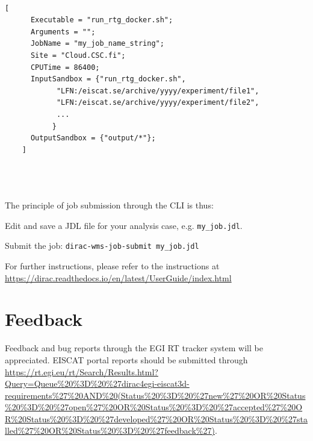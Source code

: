 \documentclass[a4paper]{article}
\begin{document}
\begin{verbatim}
 
[
      Executable = "run_rtg_docker.sh";
      Arguments = "";
      JobName = "my_job_name_string";
      Site = "Cloud.CSC.fi";
      CPUTime = 86400;
      InputSandbox = {"run_rtg_docker.sh",
            "LFN:/eiscat.se/archive/yyyy/experiment/file1",
            "LFN:/eiscat.se/archive/yyyy/experiment/file2",
            ...
           }
      OutputSandbox = {"output/*"};
    ]


  
\end{verbatim}

The principle of job submission through the CLI is thus:

\begin{description}
\item Edit and save a JDL file for your analysis case, e.g. \verb+my_job.jdl+.
  
\item Submit the job: \verb+dirac-wms-job-submit my_job.jdl+

\end{description}

For further instructions, please refer to the instructions at
\url{https://dirac.readthedocs.io/en/latest/UserGuide/index.html}

\section{Feedback}
\label{sec:feedback}
Feedback and bug reports through the EGI RT tracker system will be appreciated. EISCAT portal reports should be submitted through
 \url{https://rt.egi.eu/rt/Search/Results.html?Query=Queue\%20\%3D\%20\%27dirac4egi-eiscat3d-requirements\%27\%20AND\%20(Status\%20\%3D\%20\%27new\%27\%20OR\%20Status\%20\%3D\%20\%27open\%27\%20OR\%20Status\%20\%3D\%20\%27accepted\%27\%20OR\%20Status\%20\%3D\%20\%27developed\%27\%20OR\%20Status\%20\%3D\%20\%27stalled\%27\%20OR\%20Status\%20\%3D\%20\%27feedback\%27)}.
\end{document}
